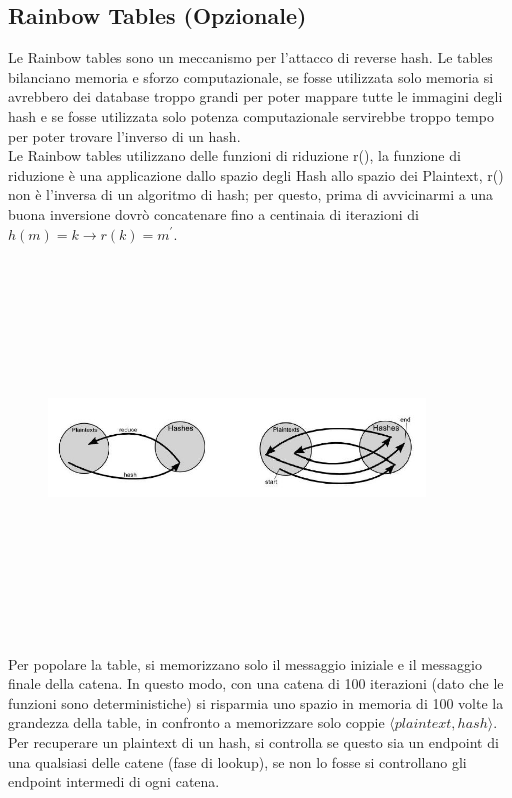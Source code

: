 \subsection{Rainbow Tables (Opzionale)}
Le Rainbow tables sono un meccanismo per l'attacco di reverse hash. Le tables bilanciano memoria e sforzo computazionale, se fosse utilizzata solo memoria si avrebbero dei database troppo grandi per poter mappare tutte le immagini degli hash e se fosse utilizzata solo potenza computazionale servirebbe troppo tempo per poter trovare l'inverso di un hash.\\
Le Rainbow tables utilizzano delle funzioni di riduzione r(), la funzione di riduzione è una applicazione dallo spazio degli Hash allo spazio dei Plaintext, r() non è l'inversa di un algoritmo di hash; per questo, prima di avvicinarmi a una buona inversione dovrò concatenare fino a centinaia di iterazioni di $h(m) = k \longrightarrow r(k) = m^{'}$.
\begin{figure}
	\begin{center}
	{\includegraphics[height=10cm, width=10cm, keepaspectratio]{Immagini/Capitolo4/riduzione.JPG}}
	\end{center}
\end{figure}
Per popolare la table, si memorizzano solo il messaggio iniziale e il messaggio finale della catena. In questo modo, con una catena di 100 iterazioni (dato che le funzioni sono deterministiche) si risparmia uno spazio in memoria di 100 volte la grandezza della table, in confronto a memorizzare solo coppie $\langle plaintext, hash \rangle$.
Per recuperare un plaintext di un hash, si controlla se questo sia un endpoint di una qualsiasi delle catene (fase di lookup), se non lo fosse si controllano gli endpoint intermedi di ogni catena.

